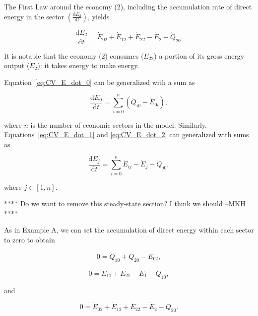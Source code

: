 The First Law around the economy (2), 
including the accumulation rate of direct energy in the sector 
$\left(\frac{\mathrm{d}E_{2}}{\mathrm{d}t}\right)$, yields

\begin{equation} \label{eq:CV_E_dot_2}
	\frac{\mathrm{d}E_{2}}{\mathrm{d}t} 
	= \dot{E}_{02} 
	+ \dot{E}_{12}
	+ \dot{E}_{22} 
	- \dot{E}_{2} 
	- \dot{Q}_{20}.
\end{equation}

\noindent It is notable that the economy (2) consumes ($\dot{E}_{22}$)
a portion of its gross energy output ($\dot{E}_2$): it takes energy to make energy.

Equation~\ref{eq:CV_E_dot_0} can be generalized with a sum as

\begin{equation} \label{eq:CV_E_biosphere_general}
	\frac{\mathrm{d}E_{0}}{\mathrm{d}t} 
	= \sum\limits_{i=0}^n \left( \dot{Q}_{i0} - \dot{E}_{0i} \right),
\end{equation}

\noindent where $n$ is the number of economic sectors in the model.
Similarly, Equations~\ref{eq:CV_E_dot_1} and \ref{eq:CV_E_dot_2} 
can generalized with sums as

\begin{equation} \label{eq:CV_E_econ_general}
	\frac{\mathrm{d}E_{j}}{\mathrm{d}t} 
	= \sum\limits_{i=0}^n\dot{E}_{ij} 
	- \dot{E}_{j}  
	- \dot{Q}_{j0},
\end{equation}

\noindent where $j \in [1, n]$.

**** Do we want to remove this steady-state section? I think we should --MKH **** 

As in Example A, we can set the accumulation of direct energy 
within each sector to zero to obtain

\begin{equation} \label{eq:CV_E_dot_0_SS}
	0 
	= \dot{Q}_{10} 
	+ \dot{Q}_{20} 
	- \dot{E}_{02},
\end{equation}

\begin{equation} \label{eq:CV_E_dot_1_SS}
	0 
	= \dot{E}_{11} 
	+ \dot{E}_{21}
	- \dot{E}_{1}
	- \dot{Q}_{10},
\end{equation}

\noindent and 

\begin{equation} \label{eq:CV_E_dot_2_SS}
	0 
	= \dot{E}_{02} 
	+ \dot{E}_{12}
	+ \dot{E}_{22} 
	- \dot{E}_{2} 
	- \dot{Q}_{20}.
\end{equation}



